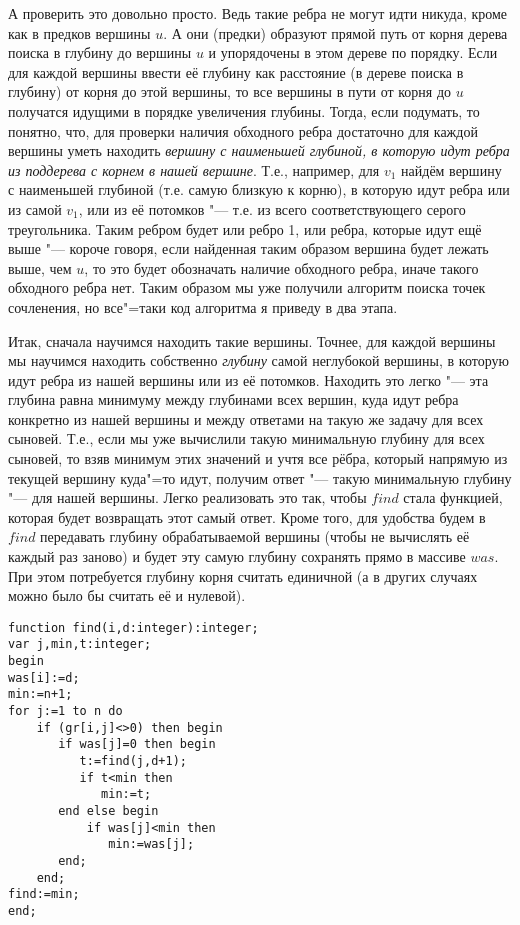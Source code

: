 А проверить это довольно просто. Ведь такие ребра не могут идти никуда, кроме как в предков вершины
$u$. А они (предки) образуют прямой путь от корня дерева поиска в глубину до вершины $u$ и упорядочены
в этом дереве по порядку. Если для каждой вершины ввести её глубину как расстояние (в дереве поиска в глубину)
от корня до этой вершины, то все вершины в пути от корня до $u$ получатся идущими в порядке увеличения глубины.
Тогда, если подумать, то понятно, что, для проверки наличия обходного ребра достаточно для
каждой вершины уметь находить \textit{вершину с наименьшей глубиной, в которую идут ребра из поддерева с корнем
в нашей вершине}. Т.е., например, для $v_1$ найдём вершину с наименьшей глубиной (т.е. самую близкую к корню),
в которую идут ребра или из самой $v_1$, или из её потомков "--- т.е. из всего соответствующего серого
треугольника. Таким ребром будет или ребро 1, или ребра, которые идут ещё выше "--- короче говоря, если
найденная таким образом вершина будет лежать выше, чем $u$, то это будет обозначать наличие обходного ребра,
иначе такого обходного ребра нет. Таким образом мы уже получили алгоритм поиска точек сочленения,
но все"=таки код алгоритма я приведу в два этапа.

Итак, сначала научимся находить такие вершины. Точнее, для каждой вершины мы научимся находить собственно
\textit{глубину} самой неглубокой вершины, в которую идут ребра из нашей вершины или из её потомков. Находить
это легко "--- эта глубина равна минимуму между глубинами всех вершин, куда идут ребра конкретно из нашей вершины
и между ответами на такую же задачу для всех сыновей. Т.е., если мы уже вычислили такую минимальную глубину
для всех сыновей, то взяв минимум этих значений и учтя все рёбра, который напрямую из текущей вершину куда"=то
идут, получим ответ "--- такую минимальную глубину "--- для нашей вершины. Легко реализовать это так, чтобы
$find$ стала функцией, которая будет возвращать этот самый ответ. Кроме того, для удобства будем в $find$ передавать
глубину обрабатываемой вершины (чтобы не вычислять её каждый раз заново) и будет эту самую глубину сохранять 
прямо в массиве $was$. При этом потребуется глубину корня считать единичной (а в других случаях можно было бы считать её
и нулевой).
\begin{codesampleo}\begin{verbatim}
function find(i,d:integer):integer;
var j,min,t:integer;
begin
was[i]:=d;
min:=n+1;
for j:=1 to n do
    if (gr[i,j]<>0) then begin
       if was[j]=0 then begin
          t:=find(j,d+1);
          if t<min then
             min:=t;
       end else begin
           if was[j]<min then
              min:=was[j];
       end;
    end;
find:=min;
end;
\end{verbatim}\end{codesampleo}

